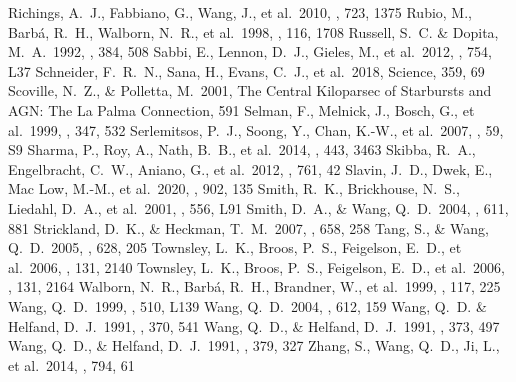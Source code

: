 \documentclass[usenatbib]{mnras}
\begin{document}
\begin{thebibliography}{}
Richings, A.~J., Fabbiano, G., Wang, J., et al.\ 2010, \apj, 723, 1375
Rubio, M., Barb{\'a}, R.~H., Walborn, N.~R., et al.\ 1998, \aj, 116, 1708
Russell, S.~C. \& Dopita, M.~A.\ 1992, \apj, 384, 508
Sabbi, E., Lennon, D.~J., Gieles, M., et al.\ 2012, \apjl, 754, L37
Schneider, F.~R.~N., Sana, H., Evans, C.~J., et al.\ 2018, Science, 359, 69
Scoville, N.~Z., \& Polletta, M.\ 2001, The Central Kiloparsec of Starbursts and AGN: The La Palma Connection, 591
Selman, F., Melnick, J., Bosch, G., et al.\ 1999, \aap, 347, 532
Serlemitsos, P.~J., Soong, Y., Chan, K.-W., et al.\ 2007, \pasj, 59, S9
Sharma, P., Roy, A., Nath, B.~B., et al.\ 2014, \mnras, 443, 3463
Skibba, R.~A., Engelbracht, C.~W., Aniano, G., et al.\ 2012, \apj, 761, 42
Slavin, J.~D., Dwek, E., Mac Low, M.-M., et al.\ 2020, \apj, 902, 135
Smith, R.~K., Brickhouse, N.~S., Liedahl, D.~A., et al.\ 2001, \apjl, 556, L91
Smith, D.~A., \& Wang, Q.~D.\ 2004, \apj, 611, 881
Strickland, D.~K., \& Heckman, T.~M.\ 2007, \apj, 658, 258
Tang, S., \& Wang, Q.~D.\ 2005, \apj, 628, 205
Townsley, L.~K., Broos, P.~S., Feigelson, E.~D., et al.\ 2006, \aj, 131, 2140
Townsley, L.~K., Broos, P.~S., Feigelson, E.~D., et al.\ 2006, \aj, 131, 2164
Walborn, N.~R., Barb{\'a}, R.~H., Brandner, W., et al.\ 1999, \aj, 117, 225
Wang, Q.~D.\ 1999, \apjl, 510, L139
Wang, Q.~D.\ 2004, \apj, 612, 159
Wang, Q.~D. \& Helfand, D.~J.\ 1991, \apj, 370, 541
Wang, Q.~D., \& Helfand, D.~J.\ 1991, \apj, 373, 497
Wang, Q.~D., \& Helfand, D.~J.\ 1991, \apj, 379, 327
Zhang, S., Wang, Q.~D., Ji, L., et al.\ 2014, \apj, 794, 61
\end{thebibliography}
\end{document}
